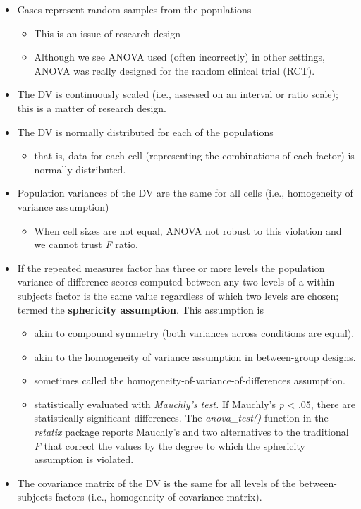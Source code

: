 \documentclass[
  11pt,
]{book}
\providecommand{\tightlist}{%
  \setlength{\itemsep}{0pt}\setlength{\parskip}{0pt}}
\begin{document}
\begin{itemize}
\tightlist
\item
  Cases represent random samples from the populations

  \begin{itemize}
  \tightlist
  \item
    This is an issue of research design
  \item
    Although we see ANOVA used (often incorrectly) in other settings, ANOVA was really designed for the random clinical trial (RCT).
  \end{itemize}
\item
  The DV is continuously scaled (i.e., assessed on an interval or ratio scale); this is a matter of research design.
\item
  The DV is normally distributed for each of the populations

  \begin{itemize}
  \tightlist
  \item
    that is, data for each cell (representing the combinations of each factor) is normally distributed.
  \end{itemize}
\item
  Population variances of the DV are the same for all cells (i.e., homogeneity of variance assumption)

  \begin{itemize}
  \tightlist
  \item
    When cell sizes are not equal, ANOVA not robust to this violation and we cannot trust \emph{F} ratio.
  \end{itemize}
\item
  If the repeated measures factor has three or more levels the population variance of difference scores computed between any two levels of a within-subjects factor is the same value regardless of which two levels are chosen; termed the \textbf{sphericity assumption}. This assumption is

  \begin{itemize}
  \tightlist
  \item
    akin to compound symmetry (both variances across conditions are equal).
  \item
    akin to the homogeneity of variance assumption in between-group designs.
  \item
    sometimes called the homogeneity-of-variance-of-differences assumption.
  \item
    statistically evaluated with \emph{Mauchly's test.} If Mauchly's \emph{p} \textless{} .05, there are statistically significant differences. The \emph{anova\_test()} function in the \emph{rstatix} package reports Mauchly's and two alternatives to the traditional \emph{F} that correct the values by the degree to which the sphericity assumption is violated.
  \end{itemize}
\item
  The covariance matrix of the DV is the same for all levels of the between-subjects factors (i.e., homogeneity of covariance matrix).
\end{itemize}
\end{document}
